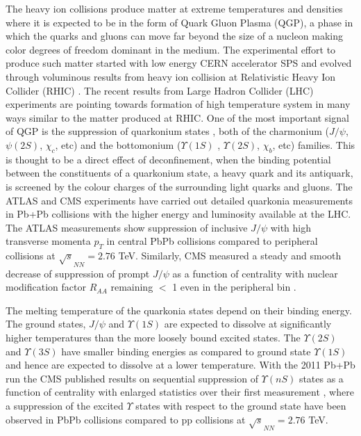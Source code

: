\documentclass[aps,prc,preprint,superscriptaddress,showpacs,showkeys]{revtex4-1}
\begin{document}
   The heavy ion collisions produce matter at extreme temperatures and densities where 
it is expected to be in the form of Quark Gluon Plasma 
(QGP), a phase in which the quarks and gluons can move far beyond  the size of a nucleon 
making color degrees of freedom dominant in the medium. 
  The experimental effort to produce such matter started with low energy CERN accelerator 
SPS and evolved through voluminous results 
from heavy ion collision at Relativistic Heavy Ion Collider (RHIC) \cite{INTRO}.
The recent results from Large Hadron Collider (LHC) experiments \cite{QGP_Tc} are 
pointing towards formation of high temperature system in many ways similar to the matter
produced at RHIC. 
  One of the most important signal of QGP is the suppression of 
quarkonium states \cite{SATZ}, both of the charmonium ($J/\psi$, $\psi(2S)$, $\chi_{c}$, etc) 
and the bottomonium ($\Upsilon(1S)$ , $\Upsilon(2S)$, $\chi_{b}$, etc) families. This is thought to be a 
direct effect of deconfinement, when the binding potential between the constituents of a quarkonium state, 
a heavy quark and its antiquark, is screened by the colour charges of the surrounding light quarks and gluons. 
 The ATLAS and CMS experiments have carried out detailed quarkonia measurements in Pb+Pb collisions 
with the higher energy and luminosity available at the LHC.
 The ATLAS measurements \cite{ATLAS} show suppression of inclusive $J/\psi$ with high transverse momenta $p_T$  
in central PbPb collisions compared to peripheral collisions at $\sqrt s_{NN} = 2.76$ TeV. 
  Similarly, CMS measured a steady and smooth decrease of suppression 
of prompt $J/\psi$ as a function of centrality with nuclear modification factor $R_{AA}$ remaining $<$ 1 even 
in the peripheral bin \cite{JCMS}. 
 
 The melting temperature of the quarkonia states depend on their binding energy. The ground states, 
$J/\psi$ and $\Upsilon(1S)$ are expected to dissolve at significantly higher temperatures than the 
more loosely bound excited states. 
   The $\Upsilon(2S)$ and $\Upsilon(3S)$ have smaller binding energies as compared to ground
state $\Upsilon(1S)$ and hence are expected to dissolve at a lower temperature. 
 With the 2011 Pb+Pb run the CMS published results on sequential suppression of 
$\Upsilon(nS)$ states as a function of centrality \cite{CMSU2} with enlarged statistics
over their first measurement \cite{UCMS}, where a suppression of the excited $\Upsilon$ states with respect 
to the ground state have been observed  
in PbPb collisions compared to pp collisions at $\sqrt s_{NN} = 2.76$ TeV.\cite{YSuppAbdShuk}
\end{document}
